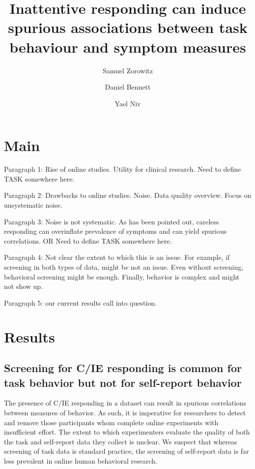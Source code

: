 \documentclass[a4paper,notitlepage,12pt]{article}
\author[1]{Samuel Zorowitz}
\author[1,2]{Daniel Bennett}
\author[1,3]{Yael Niv}
\affil[1]{Princeton Neuroscience Institute, Princeton University, USA}
\affil[2]{Department of Psychiatry, Monash University, Australia}
\affil[3]{Department of Psychology, Princeton University, USA}
\title{Inattentive responding can induce spurious associations between task behaviour and symptom measures}
\date{}
\begin{document}
\maketitle


\clearpage

\setlength{\parindent}{0em}
\setlength{\parskip}{1em}

\section{Main}

Paragraph 1: Rise of online studies. Utility for clinical research. Need to define TASK somewhere here.

Paragraph 2: Drawbacks to online studies. Noise. Data quality overview. Focus on unsystematic noise.

Paragraph 3: Noise is not systematic. As has been pointed out, careless responding can overinflate prevalence of symptoms and can yield spurious correlations. OR Need to define TASK somewhere here.

Paragraph 4: Not clear the extent to which this is an issue. For example, if screening in both types of data, might be not an issue. Even without screening, behavioral screening might be enough. Finally, behavior is complex and might not show up.

Paragraph 5: our current results call into question.

\section{Results}

\subsection{Screening for C/IE responding is common for task behavior but not for self-report behavior}

The presence of C/IE responding in a dataset can result in spurious correlations between measures of behavior. As such, it is imperative for researchers to detect and remove those participants whom complete online experiments with insufficient effort. The extent to which experimenters evaluate the quality of both the task and self-report data they collect is unclear. We suspect that whereas screening of task data is standard practice, the screening of self-report data is far less prevalent in online human behavioral research. 
\end{document}
